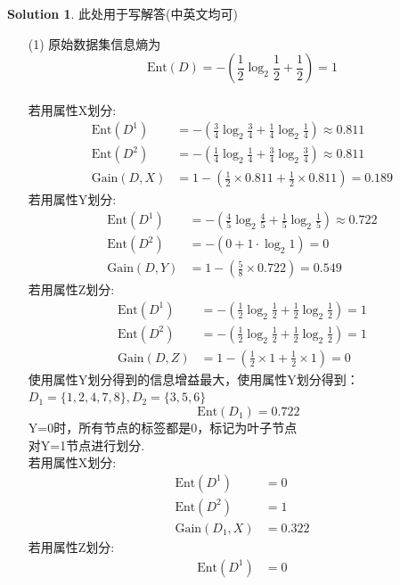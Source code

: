 \documentclass[a4paper,UTF8]{article}
\numberwithin{equation}{section}
\theoremstyle{definition}
\newtheorem*{solution}{Solution}
\begin{document}
\begin{solution}
此处用于写解答(中英文均可)
\begin{enumerate}
	\item[(1)]
	原始数据集信息熵为 $$\text{Ent}(D) = -(\frac{1}{2}\log_2 \frac{1}{2} + \frac{1}{2}) = 1$$ \\
	若用属性X划分: \\
	\begin{align*}
		\text{Ent}(D^1) &= -\left(\frac{3}{4}\log_2 \frac{3}{4} + \frac{1}{4}\log_2 \frac{1}{4}\right) \approx 0.811 \\
		\text{Ent}(D^2) &= -\left(\frac{1}{4}\log_2 \frac{1}{4} + \frac{3}{4}\log_2 \frac{3}{4}\right) \approx 0.811 \\
		\text{Gain}(D,X) &= 1-\left(\frac{1}{2}\times 0.811 + \frac{1}{2}\times 0.811\right) = 0.189
	\end{align*}
	若用属性Y划分: \\
	\begin{align*}
		\text{Ent}(D^1) &= -\left(\frac{4}{5}\log_2 \frac{4}{5} + \frac{1}{5}\log_2 \frac{1}{5}\right) \approx 0.722 \\
		\text{Ent}(D^2) &= -(0 + 1\cdot \log_2 1) = 0 \\
		\text{Gain}(D,Y) &= 1-\left( \frac{5}{8} \times 0.722\right) = 0.549
	\end{align*}
	若用属性Z划分: \\
	\begin{align*}
		\text{Ent}(D^1) &= -\left( \frac{1}{2} \log_2 \frac{1}{2} + \frac{1}{2}\log_2 \frac{1}{2} \right) = 1 \\
		\text{Ent}(D^2) &= -\left( \frac{1}{2}\log_2 \frac{1}{2} + \frac{1}{2} \log_2 \frac{1}{2} \right) = 1 \\
		\text{Gain}(D,Z) &= 1- (\frac{1}{2}\times 1 + \frac{1}{2} \times 1) = 0
	\end{align*}
	使用属性Y划分得到的信息增益最大，使用属性Y划分得到：$D_1 = \{1,2,4,7,8\},D_2 = \{3,5,6\}$
	$$\quad \text{Ent}(D_1)=0.722$$
	Y=0时，所有节点的标签都是0，标记为叶子节点\\
	对Y=1节点进行划分.\\
	若用属性X划分:
	\begin{align*}
		\text{Ent}(D^1) &= 0 \\
		\text{Ent}(D^2) &= 1 \\
		\text{Gain}(D_1,X) &= 0.322
	\end{align*}
	若用属性Z划分:
	\begin{align*}
		\text{Ent}(D^1) &= 0 \\

\end{align*}
\end{enumerate}
\end{solution}
\end{document}
